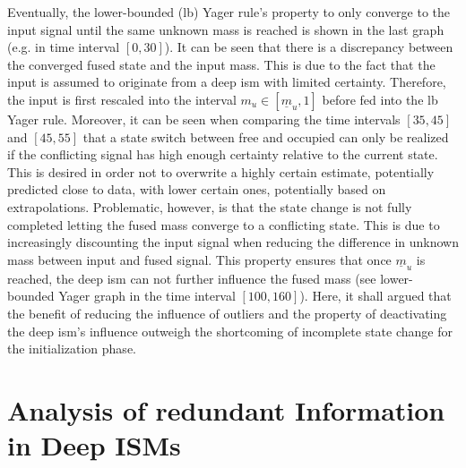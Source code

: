 Eventually, the lower-bounded (lb) Yager rule's property to only converge to the input signal until the same unknown mass is reached is shown in the last graph (e.g. in time interval $[0, 30]$). It can be seen that there is a discrepancy between the converged fused state and the input mass. This is due to the fact that the input is assumed to originate from a deep \gls{ism} with limited certainty. Therefore, the input is first rescaled into the interval $m_u \in [\underline{m}_u, 1]$ before fed into the lb Yager rule. Moreover, it can be seen when comparing the time intervals $[35, 45]$ and $[45, 55]$ that a state switch between free and occupied can only be realized if the conflicting signal has high enough certainty relative to the current state. This is desired in order not to overwrite a highly certain estimate, potentially predicted close to data, with lower certain ones, potentially based on extrapolations. Problematic, however, is that the state change is not fully completed letting the fused mass converge to a conflicting state. This is due to increasingly discounting the input signal when reducing the difference in unknown mass between input and fused signal. This property ensures that once $\underline{m}_u$ is reached, the deep \gls{ism} can not further influence the fused mass (see lower-bounded Yager graph in the time interval $[100, 160]$). Here, it shall argued that the benefit of reducing the influence of outliers and the property of deactivating the deep \gls{ism}'s influence outweigh the shortcoming of incomplete state change for the initialization phase. 
%
\section{Analysis of redundant Information in Deep ISMs}
\label{sec:exp_analyze_redundant_info}
%
